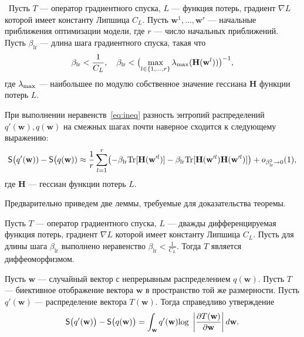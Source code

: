 \begin{theorem}~Пусть $T$ --- оператор градиентного спуска,
 $L$ --- функция потерь, градиент $\nabla L$ которой имеет константу Липшица $C_L$.  Пусть $\mathbf{w}^1,\dots,\mathbf{w}^r$ ---  начальные приближения оптимизации модели, где $r$ --- число начальных приближений. Пусть $\beta_{\text{lr}}$ --- длина шага градиентного спуска, такая что
\begin{equation}
\label{eq:ineq}
\beta_{\text{lr}}<\frac{1}{C_L}, \quad \beta_{\text{lr}} < \bigl(\max_{l \in \{1,\dots,r\}}\lambda_\textnormal{max} (\mathbf{H}(\mathbf{w}^l))\bigr)^{-1}, 
\end{equation}
где $\lambda_\textnormal{max}$ --- наибольшее по модулю собственное значение гессиана  $\mathbf{H}$ функции потерь $L$.

При выполнении неравенств~\eqref{eq:ineq} разность энтропий распределений $q'(\mathbf{w}), q(\mathbf{w})$ на смежных шагах почти наверное сходится к следующему выражению: 
\begin{equation}
\label{eq:entropy}
	\mathsf{S}\bigl(q'(\mathbf{w})) -  \mathsf{S}\bigl(q(\mathbf{w}))  \approx  \frac{1}{r}\sum_{l=1}^r \bigl(-\beta_{\text{lr}} \textnormal{Tr}[\mathbf{H}(\mathbf{w}'^l)] - \beta_{\text{lr}} \textnormal{Tr}[\mathbf{H}(\mathbf{w}'^l)\mathbf{H}(\mathbf{w}'^l)]  \bigr) + o_{\beta_{\text{lr}}^2 \to 0}(1),
\end{equation}
где $\mathbf{H}$ --- гессиан функции потерь $L$.
\end{theorem}

Предварительно приведем две леммы, требуемые для доказательства теоремы.
\begin{lemma} Пусть $T$ --- оператор градиентного спуска, $L$ --- дважды дифференцируемая функция потерь, градиент $\nabla L$ которой имеет константу Липшица $C_L$.  Пусть для длины шага $\beta_{\text{lr}}$ выполнено неравенство 
$
	\beta_{\text{lr}}<\frac{1}{C_L}.
$
Тогда $T$ является диффеоморфизмом.
\end{lemma}

\begin{lemma} Пусть $\mathbf{w}$ --- случайный вектор с непрерывным распределением $q(\mathbf{w})$. Пусть $T$ --- биективное отображение вектора $\mathbf{w}$ в пространство той же размерности. Пусть $q'(\mathbf{w})$ --- распределение вектора $T(\mathbf{w})$. Тогда справедливо утверждение
\begin{equation}
\label{eq:entropy_biject}
	\mathsf{S}\bigl(q'(\mathbf{w})\bigr) -  \mathsf{S}\bigl(q(\mathbf{w})\bigr)  = \int_\mathbf{w}  q'(\mathbf{w}) \textnormal{log}~\left|\frac{\partial{T(\mathbf{w})}}{\partial{\mathbf{w}}}\right| d\mathbf{w}.
\end{equation}
\end{lemma}


